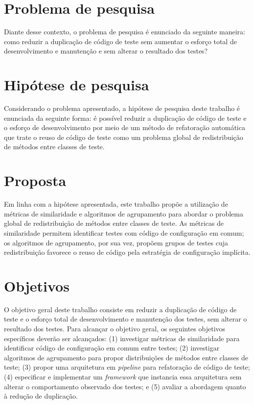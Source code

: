 \section{Problema de pesquisa}

Diante desse contexto, o problema de pesquisa é enunciado da seguinte maneira: como reduzir a duplicação de código de teste sem aumentar o esforço total de desenvolvimento e manutenção e sem alterar o resultado dos testes?

\section{Hipótese de pesquisa}

Considerando o problema apresentado, a hipótese de pesquisa deste trabalho é enunciada da seguinte forma: é possível reduzir a duplicação de código de teste e o esforço de desenvolvimento por meio de um método de refatoração automática que trate o reuso de código de teste como um problema global de redistribuição de métodos entre classes de teste.

\section{Proposta}

Em linha com a hipótese apresentada, este trabalho propõe a utilização de métricas de similaridade e algoritmos de agrupamento para abordar o problema global de redistribuição de métodos entre classes de teste. As métricas de similaridade permitem identificar testes com código de configuração em comum; os algoritmos de agrupamento, por sua vez, propõem grupos de testes cuja redistribuição favorece o reuso de código pela estratégia de configuração implícita.

\section{Objetivos}

O objetivo geral deste trabalho consiste em reduzir a duplicação de código de teste e o esforço total de desenvolvimento e manutenção dos testes, sem alterar o resultado dos testes. Para alcançar o objetivo geral, os seguintes objetivos específicos deverão ser alcançados: (1) investigar métricas de similaridade para identificar código de configuração em comum entre testes; (2) investigar algoritmos de agrupamento para propor distribuições de métodos entre classes de teste; (3) propor uma arquitetura em \textit{pipeline} para refatoração de código de teste; (4) especificar e implementar um \textit{framework} que instancia essa arquitetura sem alterar o comportamento observado dos testes; e (5) avaliar a abordagem quanto à redução de duplicação.

